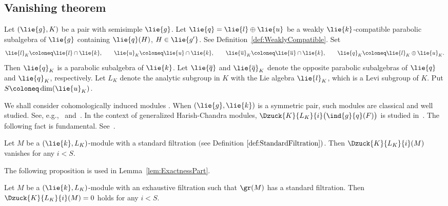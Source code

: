\subsection{Vanishing theorem}

Let $(\lie{g}, K)$ be a pair with semisimple $\lie{g}$.
Let $\lie{q} = \lie{l}\oplus \lie{u}$ be a weakly $\lie{k}$-compatible parabolic subalgebra of $\lie{g}$
containing $\lie{q}(H)$, $H \in \lie{g'}$.
See Definition~\ref{def:WeaklyCompatible}.
Set
\begin{align*}
	\lie{l}_K\coloneq \lie{l}\cap \lie{k}, \qquad \lie{u}_K\coloneq \lie{u}\cap \lie{k}, \qquad \lie{\overline{u}}_K\coloneq \lie{\overline{u}}\cap \lie{k}, \qquad \lie{q}_K\coloneq \lie{l}_K\oplus \lie{u}_K.
\end{align*}
Then $\lie{q}_K$ is a parabolic subalgebra of $\lie{k}$.
Let $\lie{\overline{q}}$ and $\lie{\overline{q}}_K$ denote the opposite parabolic subalgebras of $\lie{q}$ and $\lie{q}_K$, respectively.
Let $L_K$ denote the analytic subgroup in $K$ with the Lie algebra $\lie{l}_K$, which is a Levi subgroup of $K$.
Put $S\coloneq \dim(\lie{u}_K)$.

We shall consider cohomologically induced modules .
When $(\lie{g}, \lie{k})$ is a symmetric pair, such modules are classical and well studied.
See, e.g.,~\cite{KnVo95_cohomological_induction} and~\cite[Section~6]{Wa88_real_reductive_I}.
In the context of generalized Harish-Chandra modules, $\Dzuck{K}{L_K}{i}\bigl(\ind{g}{q}(F)\bigr)$ is studied in~\cite{PeZu04_generalized_harish_chandra,PeZu12_generalized_harish_chandra}.
The following fact is fundamental.
See~\cite[Lemma~6.4.2]{Wa88_real_reductive_I}.

\begin{Fact}\label{fact:StandardFiltrationVanishing}
	Let $M$ be a $(\lie{k}, L_K)$-module with a standard filtration $($see Definition $\ref{def:StandardFiltration})$.
	Then $\Dzuck{K}{L_K}{i}(M)$ vanishes for any $i < S$.
\end{Fact}

The following proposition is used in Lemma~\ref{lem:ExactnessPart}.

\begin{Proposition}\label{prop:StandardFiltrationVanishing}
	Let $M$ be a $(\lie{k}, L_K)$-module with an exhaustive filtration such that $\gr(M)$ has a standard filtration.
	Then $\Dzuck{K}{L_K}{i}(M)=0$ holds for any $i < S$.
\end{Proposition}

